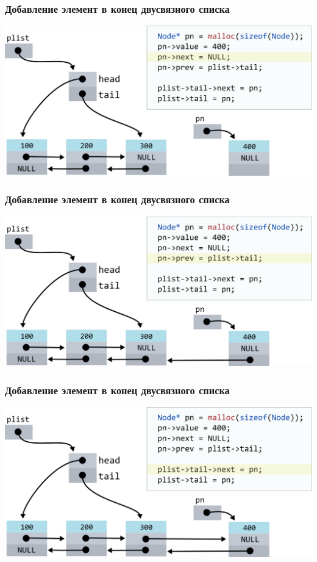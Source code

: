 \documentclass[10pt,pdf,hyperref={unicode}]{beamer}
\begin{document}
\begin{frame}[fragile]
\frametitle{Добавление элемент в конец двусвязного списка}
\begin{center}
\includegraphics[width=\imageSizeMult\linewidth]{../images/doublylist/doublylist_addlast4.png}
\end{center}
\end{frame}


\begin{frame}[fragile]
\frametitle{Добавление элемент в конец двусвязного списка}
\begin{center}
\includegraphics[width=\imageSizeMult\linewidth]{../images/doublylist/doublylist_addlast5.png}
\end{center}
\end{frame}


\begin{frame}[fragile]
\frametitle{Добавление элемент в конец двусвязного списка}
\begin{center}
\includegraphics[width=\imageSizeMult\linewidth]{../images/doublylist/doublylist_addlast6.png}
\end{center}
\end{frame}
\end{document}
